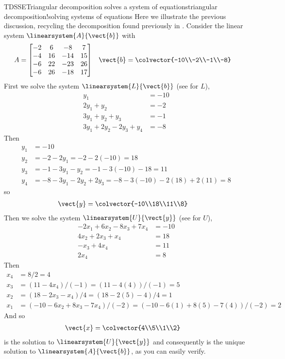 \begin{example}{TDSSE}{Triangular decomposition solves a system of equations}{triangular decomposition!solving systems of equations}
Here we illustrate the previous discussion, recycling the decomposition found previously in .  Consider the linear system $\linearsystem{A}{\vect{b}}$ with 
%
\begin{align*}
A&=
\begin{bmatrix}
 -2 & 6 & -8 & 7 \\
 -4 & 16 & -14 & 15 \\
 -6 & 22 & -23 & 26 \\
 -6 & 26 & -18 & 17
\end{bmatrix}
&
\vect{b}
&=\colvector{-10\\-2\\-1\\-8}
\end{align*}
%
First we solve the system $\linearsystem{L}{\vect{b}}$ (see  for $L$),
%
\begin{align*}
y_1 &= -10\\ 
2y_1 + y_2 &= -2\\ 
3y_1 + y_2 + y_3 &= -1\\ 
3y_1 + 2y_2 - 2y_3 + y_4 &= -8
\end{align*}
%
Then
%
\begin{align*}
y_1 &= -10\\ 
y_2 &= -2-2y_1=-2-2(-10)=18\\ 
y_3 &= -1-3y_1 - y_2 =-1-3(-10)-18=11\\ 
y_4 &= -8-3y_1 - 2y_2 + 2y_3 = -8-3(-10)-2(18)+2(11)=8
\end{align*}
%
so
%
\begin{align*}
\vect{y}&=\colvector{-10\\18\\11\\8}
\end{align*}
%
Then we solve the system $\linearsystem{U}{\vect{y}}$ (see  for $U$),
%
\begin{align*}
-2x_1 + 6x_2 - 8x_3 + 7x_4 &=-10\\
4x_2 + 2x_3 +x_4 &=18\\
-x_3 + 4x_4 &= 11\\
2x_4 &=8
\end{align*}
%
Then
%
\begin{align*}
x_4&=8/2=4 \\
x_3 &= \left(11-4x_4\right)/(-1)=\left(11-4(4)\right)/(-1)=5\\
x_2 &= \left(18-2x_3-x_4\right)/4= \left(18-2(5)-4\right)/4=1\\
x_1 &= \left(-10-6x_2+8x_3-7x_4\right)/(-2)=\left(-10-6(1)+8(5)-7(4)\right)/(-2)=2
\end{align*}
%
And so
%
\begin{align*}
\vect{x}&=\colvector{4\\5\\1\\2}
\end{align*}
%
is the solution to $\linearsystem{U}{\vect{y}}$ and consequently is the unique solution to $\linearsystem{A}{\vect{b}}$, as you can easily verify.
%
\end{example}
